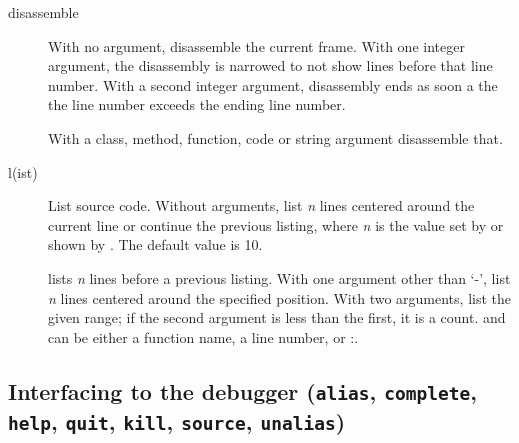 \begin{description}

\item[disassemble  ]

With no argument, disassemble the current frame.  With one integer
argument, the disassembly is narrowed to not show lines before that
line number. With a second integer argument, disassembly ends as soon
a the the line number exceeds the ending line number.

With a class, method, function, code or string argument disassemble
that.

\item[l(ist) ]\label{command:list}

List source code.  Without arguments, list
\emph{n} lines centered around the current line or continue the previous
listing, where \emph{n} is the value set by  or
shown by .  The default value is 10.

 lists \emph{n} lines before a previous listing. With one
argument other than `-', list \emph{n} lines centered around the
specified position.  With two arguments, list the given range; if the
second argument is less than the first, it is a count.  and
 can be either a function name, a line number, or
:.

\end{description}

\subsection{Interfacing to the debugger ({\tt alias}, {\tt complete}, 
{\tt help}, {\tt quit}, {\tt kill}, {\tt source}, {\tt unalias})\label{subsection-misc}}

